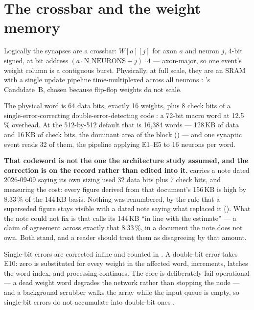 \section{The crossbar and the weight memory}

Logically the synapses are a crossbar: $W[a][j]$ for axon $a$ and
neuron $j$, 4-bit signed, at bit address
$(a \cdot \mathrm{N\_NEURONS} + j)\cdot 4$ --- axon-major, so one
event's weight column is a contiguous burst. Physically, at full scale,
they are an SRAM with a single update pipeline time-multiplexed across
all neurons \cite{openspike2023}: 's Candidate~B, chosen because
flip-flop weights do not scale.

The physical word is 64 data bits, exactly 16 weights, plus 8 check
bits of a single-error-correcting double-error-detecting code
\cite{hsiao1970}: a 72-bit macro word at 12.5\,\% overhead. At the 512-by-512 default that is
16,384 words --- 128\,KB of data and 16\,KB of check bits, the dominant
area of the block () --- and one synaptic event
reads 32 of them, the pipeline applying E1--E5 to 16 neurons per
word.

\textbf{That codeword is not the one the architecture study assumed,
and the correction is on the record rather than edited into it.}
 carries a note dated 2026-09-09 saying its own
sizing used 32 data bits plus 7 check bits, and measuring the cost:
every figure derived from that document's 156\,KB is high by 8.33\,\%
of the 144\,KB basis. Nothing was renumbered, by the rule that a
superseded figure stays visible with a dated note saying what replaced
it (). What the note could not fix is that
 calls its 144\,KB ``in line with the
 estimate'' --- a claim of agreement across exactly that
8.33\,\%, in a document the note does not own. Both stand, and a reader
should treat them as disagreeing by that amount.

Single-bit errors are corrected inline and counted in .
A double-bit error takes E10: zero is substituted for every weight in
the affected word,  increments, 
latches the word index, and processing continues. The core is
deliberately fail-operational --- a dead weight word degrades the
network rather than stopping the node --- and a background scrubber
walks the array while the input queue is empty, so single-bit errors do
not accumulate into double-bit ones \cite{saleh1990}.

